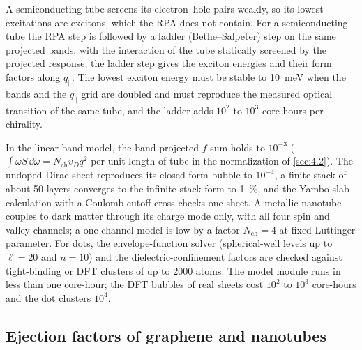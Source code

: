 A semiconducting tube screens its electron--hole pairs weakly, so its lowest excitations are excitons, which the RPA does not contain. For a semiconducting tube the RPA step is followed by a ladder (Bethe--Salpeter) step on the same projected bands, with the interaction of the tube statically screened by the projected response; the ladder step gives the exciton energies and their form factors along $q_\parallel$. The lowest exciton energy must be stable to \SI{10}{meV} when the bands and the $q_\parallel$ grid are doubled and must reproduce the measured optical transition of the same tube, and the ladder adds $10^2$ to $10^3$ core-hours per chirality.

In the linear-band model, the band-projected $f$-sum holds to $10^{-3}$ ($\int\omega S\,\dd\omega = N_{\mathrm{ch}}v_Dq^2$ per unit length of tube in the normalization of \cref{sec:4.2}). The undoped Dirac sheet reproduces its closed-form bubble to $10^{-4}$, a finite stack of about 50 layers converges to the infinite-stack form to \SI{1}{\percent}, and the Yambo slab calculation with a Coulomb cutoff cross-checks one sheet. A metallic nanotube couples to dark matter through its charge mode only, with all four spin and valley channels; a one-channel model is low by a factor $N_{\mathrm{ch}} = 4$ at fixed Luttinger parameter. For dots, the envelope-function solver (spherical-well levels up to $\ell = 20$ and $n = 10$) and the dielectric-confinement factors are checked against tight-binding or DFT clusters of up to 2000 atoms. The model module runs in less than one core-hour; the DFT bubbles of real sheets cost $10^2$ to $10^3$ core-hours and the dot clusters $10^4$.

\subsection{Ejection factors of graphene and nanotubes}

